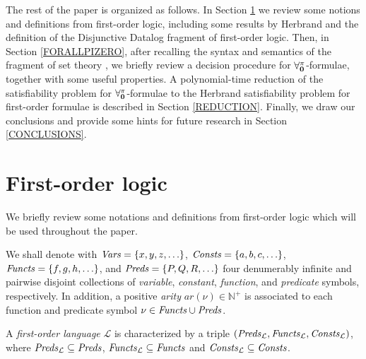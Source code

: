 \documentclass[a4paper]{llncs}
\newcommand{\Lang}{\ensuremath{\mathcal{L}\xspace}} %
\newcommand{\LangPreds}{\Preds_{\Lang}}
\newcommand{\LangFuncts}{\Functs_{\Lang}}
\newcommand{\LangConsts}{\Consts_{\Lang}}
\newcommand{\ar}{\mathit{ar}}
\newcommand{\nat}{\mathbb{N}}
\begin{document}
The rest of the paper is organized as follows.  In Section
\ref{PRELIMINARIES} we review some notions and definitions from
first-order logic, including some results by
Herbrand and the definition of the Disjunctive Datalog
fragment of first-order logic.  Then, in Section \ref{FORALLPIZERO},
after recalling the syntax and semantics of the fragment of set theory
\Forallpizero, we briefly review a decision procedure for
$\mathbf{\forall_{0}^{\pi}}$-formulae, together with some useful properties.  A 
polynomial-time reduction of the satisfiability problem for
$\mathbf{\forall_{0}^{\pi}}$-formulae to the Herbrand satisfiability problem for
first-order formulae is described in Section \ref{REDUCTION}.
Finally, we draw our conclusions and provide some hints for future
research in Section \ref{CONCLUSIONS}.



\section{First-order logic}\label{PRELIMINARIES}


We briefly review some notations and definitions
from first-order logic which will be used throughout the
paper.

We shall denote with
$\mathit{Vars}=\{x, y, z, \ldots \}$, $\mathit{Consts}=\{a, b, c, \ldots \}$,
$\mathit{Functs}=\{f, g, h, \ldots \}$, and $\mathit{Preds}=\{P, Q, R, \ldots\}$
four denumerably infinite and pairwise disjoint collections
of \emph{variable}, \emph{constant}, \emph{function}, and \emph{predicate}
symbols, respectively.
In addition, a positive \emph{arity} $\ar(\nu) \in \nat^+$ is 
associated to each
function and predicate symbol $\nu \in \mathit{Functs} \cup \mathit{Preds}$.
%
%

A \emph{first-order language} $\Lang$ is characterized by
a triple $(\LangPreds, \LangFuncts, \LangConsts)$, where
$\LangPreds \subseteq \Preds$, $\LangFuncts \subseteq \Functs$ and
$\LangConsts \subseteq \Consts$.
\end{document}
